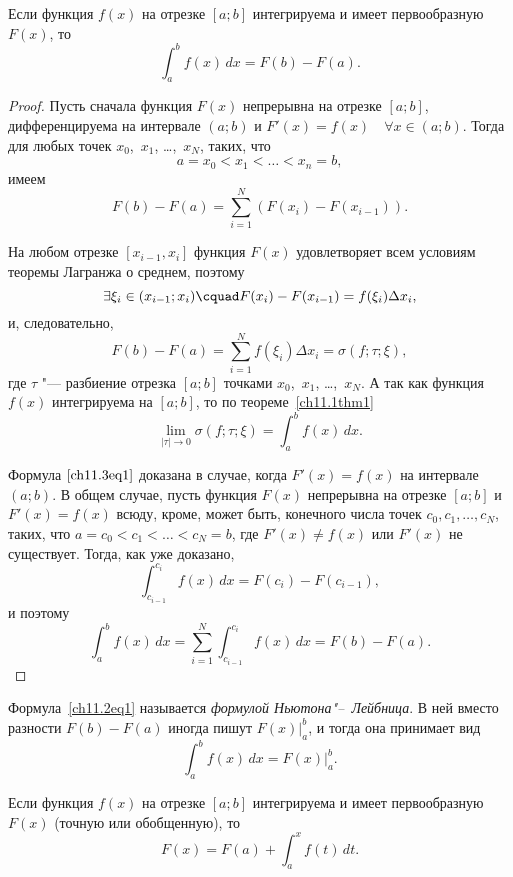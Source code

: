 \begin{thm}
Если функция $f(x)$ на отрезке $[a; b]$ интегрируема и имеет первообразную $F(x)$, то
\begin{equation} \label{ch11.3eq1}
\int_{a}^{b} f(x) \,dx = F(b) - F(a).
\end{equation}
\end{thm}

\begin{proof}
Пусть сначала функция $F(x)$ непрерывна на отрезке $[a;b]$, дифференцируема на интервале $(a;b)$ и $F'(x) = f(x) \quad \forall x \in (a;b)$. Тогда для любых точек $x_0$,~$x_1$, \ldots,~$x_N$, таких, что
$$
a = x_0 < x_1 < \ldots < x_n = b,
$$
имеем
$$
F(b) - F(a) = \sum_{i = 1}^{N} \left( F(x_i) - F(x_{i - 1}) \right).
$$

На любом отрезке $[x_{i - 1}, x_i]$ функция $F(x)$ удовлетворяет всем условиям теоремы Лагранжа о среднем, поэтому
$$
\exists \xi_i \in (x_{i - 1}; x_i) \cquad F(x_i) - F(x_{i - 1}) = f(\xi_i) \Delta x_i,
$$
и, следовательно,
$$
F(b) - F(a) = \sum_{i = 1}^{N} f(\xi_i) \Delta x_i = \sigma(f;\tau;\xi),
$$
где $\tau$ "--- разбиение отрезка $[a;b]$ точками $x_0$,~$x_1$, \ldots,~$x_N$. А так как функция $f(x)$ интегрируема на $[a;b]$, то по теореме~\ref{ch11.1thm1}
$$
\lim_{|\tau| \to 0} \sigma (f;\tau; \xi) = \int_{a}^{b} f(x) \,dx.
$$

Формула $\eqref{ch11.3eq1}$ доказана в случае, когда $F'(x) = f(x)$ на интервале $(a;b)$. В общем случае, пусть функция $F(x)$ непрерывна на отрезке $[a;b]$ и $F'(x) = f(x)$ всюду, кроме, может быть, конечного числа точек $c_0, c_1, \ldots, c_N$, таких, что $a = c_0 < c_1 < \ldots < c_N = b$, где $F'(x) \not= f(x)$ или $F'(x)$ не существует. Тогда, как уже доказано,
$$
\int_{c_{i - 1}}^{c_i} f(x) \,dx = F(c_i) - F(c_{i - 1}),
$$
и поэтому
\begin{equation*}
\int_{a}^{b} f(x) \,dx = \sum_{i = 1}^{N} \int_{c_{i - 1}}^{c_{i}} f(x) \,dx = F(b) - F(a). \tag*{$\qedhere$}
\end{equation*}
\end{proof}


Формула~\eqref{ch11.2eq1} называется \textit{формулой Ньютона"--~Лейбница}. В ней вместо разности $F(b) - F(a)$ иногда пишут $F(x)\big|_{a}^{b}$, и тогда она принимает вид
$$
\int_{a}^{b} f(x) \,dx = F(x)\bigg|_{a}^{b}.
$$

\begin{cons}
Если функция $f(x)$ на отрезке $[a;b]$ интегрируема и имеет первообразную $F(x)$ (точную или обобщенную), то
$$
F(x) = F(a) + \int_{a}^{x} f(t)\,dt.
$$
\end{cons}

